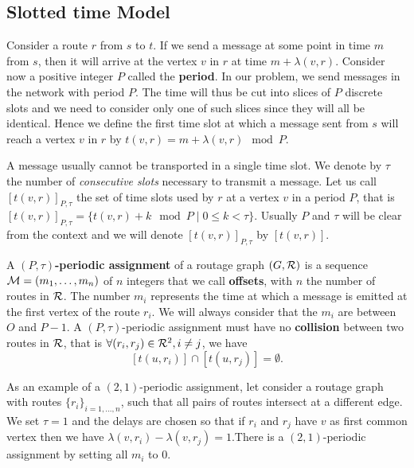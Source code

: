 \documentclass[a4paper,10pt]{article}
\begin{document}
   \subsection{Slotted time Model}
      
      Consider a route $r$ from $s$ to $t$. If we send a message at some point in time $m$ from $s$,
      then it will arrive at the vertex $v$ in $r$ at time $m + \lambda(v,r)$. Consider now a positive integer $P$ called the {\bf period}. In our problem, we send messages in the network with period $P$. The time will thus be cut into slices of $P$ discrete slots and we need to consider only one of such slices since they will all be identical. 
       Hence we define the first time slot at which a message sent from $s$ will reach a vertex $v$ in $r$ by $t(v,r) = m + \lambda(v,r) \mod P$. 
      
      A message usually cannot be transported in a single time slot. We denote by $\tau$ the number 
      of \emph{consecutive slots} necessary to transmit a message. Let us call $[t(v,r)]_{P,\tau}$ the set of time slots used by $r$ at a vertex $v$ in a period $P$, that is $[t(v,r)]_{P,\tau} = \{t(v,r) + k \mod P \mid 0 \leq k < \tau \}$. Usually $P$ and $\tau$ will be clear from the context and we will denote $[t(v,r)]_{P,\tau}$ by $[t(v,r)]$.
      
      
      A {\bf $(P,\tau)$-periodic assignment} of a routage graph $(G,\cal R)$ is a sequence  ${\cal M}=(m_1, \ldots ,m_n)$ of $n$ integers that we call {\bf offsets}, with $n$ the number of routes in $\cal R$. The number $m_{i}$ represents the time at which a message is emitted at the first vertex of the route $r_{i}$. We will always consider that the $m_{i}$ are between $O$ and $P-1$. A $(P,\tau)$-periodic assignment must have no {\bf collision} between two routes in $\cal R$, that is $\forall (r_{i}, r_{j}) \in {\cal R}^2, i \neq j$, %
      we have $$[t(u,r_{i})] \cap [t(u,r_{j})] = \emptyset .$$
      

      As an example of a $(2,1)$-periodic assignment, let consider a routage graph with routes $\{r_{i}\}_{i=1,\dots,n}$, such that all pairs of routes intersect at a different edge.
      We set $\tau = 1$ and the delays are chosen so that if $r_{i}$ and $r_{j}$ have $v$ as first common vertex then we have $\lambda(v,r_{i}) - \lambda(v,r_{j})=1$.There is a $(2,1)$-periodic assignment by setting all $m_{i}$ to $0$.
\end{document}
